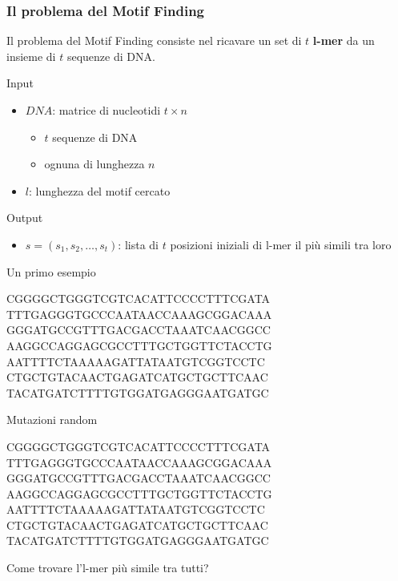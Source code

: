 \begin{frame}
	\frametitle{Il problema del Motif Finding}
	Il problema del Motif Finding consiste nel ricavare un set di $t$ \textbf{l-mer} da un insieme di $t$ sequenze di DNA.
	\begin{block}{Input}
		\begin{itemize}
			\item $DNA$: matrice di nucleotidi $t \times n$
			\begin{itemize}
				\item $t$ sequenze di DNA
				\item ognuna di lunghezza $n$
			\end{itemize}
			\item $l$: lunghezza del motif cercato
		\end{itemize}
	\end{block}
	\begin{block}{Output}
		\begin{itemize}
			\item $s=(s_1,s_2,\dots,s_t)$: lista di $t$ posizioni iniziali di l-mer il più simili tra loro
		\end{itemize}
	\end{block}
\end{frame}

\begin{frame}{Un primo esempio}
	\begin{center}
		CGGGGCTGGGTCGTCACATTCCCCTTTCGATA\\
		TTTGAGGGTGCCCAATAA\spot<2->[fill=yellow]{ATGCAACT}CCAAAGCGGACAAA\\
		GGGATGCCGTTTGACGACCTAAATCAACGGCC\\
		AAGGCCAGGAGCGCCTTTGCTGGTTCTACCTG\\
		AATTTTCTAAAAAGATTATAATGTCGGTCC\spot<2->[fill=yellow]{ATGCAACT}TC\\
		CTGCTGTACAACTGAGATCATGCTGC\spot<2->[fill=yellow]{ATGCAACT}TTCAAC\\
		TACATGATCTTTTGTGGATGAGGGAATGATGC
	\end{center}
\end{frame}

\begin{frame}{Mutazioni random}
	\begin{center}
		CGGGGCTGGGTCGTCACATTCCCCTTTCGATA\\
		TTTGAGGGTGCCCAATAACCAAAGCGGACAAA\\
		GGGATGCCGTTTGACGACCTAAATCAACGGCC\\
		AAGGCCAGGAGCGCCTTTGCTGGTTCTACCTG\\
		AATTTTCTAAAAAGATTATAATGTCGGTCC\spot<1->[fill=yellow]{tTGgAACT}TC\\
		CTGCTGTACAACTGAGATCATGCTGCTTCAAC\\
		TACATGATCTTTTGTGGATGAGGGAATGATGC
	\end{center}
	Come trovare l'l-mer più simile tra tutti?
\end{frame}

